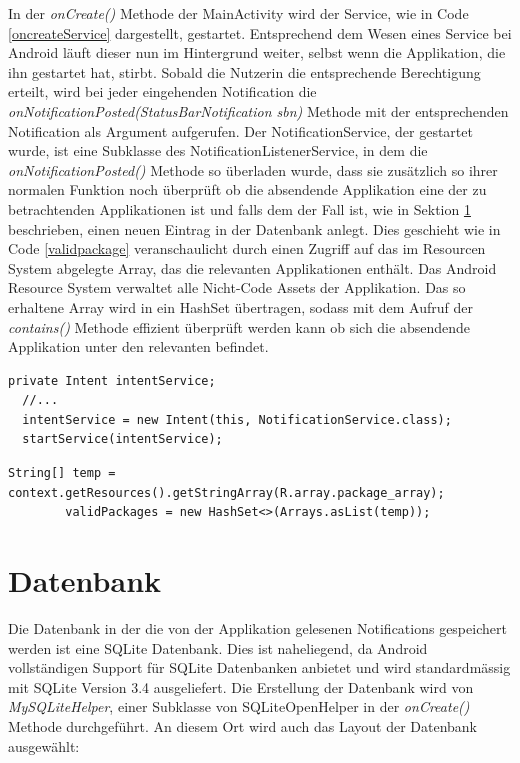 In der \emph{onCreate()} Methode der MainActivity wird der Service, wie in Code \ref{oncreateService} dargestellt, gestartet.
Entsprechend dem Wesen eines Service bei Android läuft dieser nun im Hintergrund weiter, selbst wenn die Applikation, die ihn gestartet hat, stirbt.
Sobald die Nutzerin die entsprechende Berechtigung erteilt, wird bei jeder eingehenden Notification die \emph{onNotificationPosted(StatusBarNotification sbn)} Methode mit der entsprechenden Notification als Argument aufgerufen.
Der NotificationService, der gestartet wurde, ist eine Subklasse des NotificationListenerService, in dem die  \emph{onNotificationPosted()} Methode so überladen wurde,
dass sie zusätzlich so ihrer normalen Funktion noch überprüft ob die absendende Applikation eine der zu betrachtenden Applikationen ist und falls dem der Fall ist, wie in Sektion \ref{ch:Implementierung:sec:Datenbank} beschrieben, einen neuen Eintrag in der Datenbank anlegt.
Dies geschieht wie in Code \ref{validpackage} veranschaulicht durch einen Zugriff auf das im Resourcen System abgelegte Array, das die relevanten Applikationen enthält. 
Das Android Resource System verwaltet alle Nicht-Code Assets der Applikation.
Das so erhaltene Array wird in ein HashSet übertragen, sodass mit dem Aufruf der \emph{contains()} Methode effizient überprüft werden kann ob sich die absendende Applikation unter den relevanten befindet.


\begin{lstlisting}[frame=single, caption = startService(), label=oncreateService] 
  private Intent intentService;
  //...
  intentService = new Intent(this, NotificationService.class);
  startService(intentService);
\end{lstlisting}

\begin{lstlisting}[frame=single, caption = Package Überprüfung, label=validpackage] 
String[] temp = context.getResources().getStringArray(R.array.package_array);
        validPackages = new HashSet<>(Arrays.asList(temp));
\end{lstlisting}



\section{Datenbank}
\label{ch:Implementierung:sec:Datenbank}


Die Datenbank in der die von der Applikation gelesenen Notifications gespeichert werden ist eine SQLite Datenbank.
Dies ist naheliegend, da Android vollständigen Support für SQLite Datenbanken anbietet und wird standardmässig mit SQLite Version 3.4 ausgeliefert.
Die Erstellung der Datenbank wird von \emph{MySQLiteHelper}, einer Subklasse von SQLiteOpenHelper in der \emph{onCreate()} Methode durchgeführt.
An diesem Ort wird auch das Layout der Datenbank ausgewählt:

